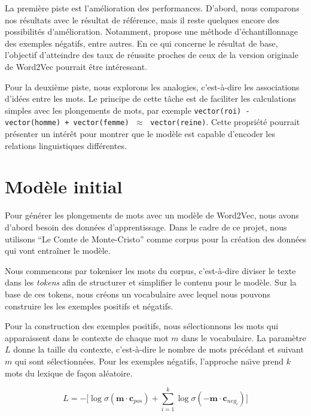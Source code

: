 \documentclass[12pt]{article}
\begin{document}
La première piste est l'amélioration des performances. D'abord, nous comparons nos résultats avec le résultat de référence, mais il reste quelques encore des possibilités d'amélioration. Notamment, \cite{DBLP:conf/nips/MikolovSCCD13} propose une méthode d’échantillonnage des exemples négatifs, entre autres. En ce qui concerne le résultat de base, l'objectif d'atteindre des taux de réussite proches de ceux de la version originale de Word2Vec pourrait être intéressant.

Pour la deuxième piste, nous explorons les analogies, c'est-à-dire les associations d'idées entre les mots. Le principe de cette tâche est de faciliter les calculations simples avec les plongements de mots, par exemple \texttt{vector(roi) - vector(homme) + vector(femme)} $\;\approx\;$ \texttt{vector(reine)}. Cette propriété pourrait présenter un intérêt pour montrer que le modèle est capable d'encoder les relations linguistiques différentes.

\section{Modèle initial} \label{modèle initial}

Pour générer les plongements de mots avec un modèle de Word2Vec, nous avons d'abord besoin des données d'apprentissage. Dans le cadre de ce projet, nous utilisons ``Le Comte de Monte-Cristo'' comme corpus pour la création des données qui vont entraîner le modèle.

Nous commencons par tokeniser les mots du corpus, c'est-à-dire diviser le texte dans les \textit{tokens} afin de structurer et simplifier le contenu pour le modèle. Sur la base de ces tokens, nous créons un vocabulaire avec lequel nous pouvons construire les les exemples positifs et négatifs.

Pour la construction des exemples positifs, nous sélectionnons les mots qui apparaissent dans le contexte de chaque mot $m$ dans le vocabulaire. La paramètre $L$ donne la taille du contexte, c'est-à-dire le nombre de mots précédant et suivant $m$ qui sont sélectionnées. Pour les exemples négatifs, l'approche na\"\i ve prend $k$ mots du lexique de façon aléatoire. 

\begin{equation}\label{eq:loss}
    L = -\lbrack \log \sigma(\mathbf{m} \cdot \mathbf{c}_{pos}) + \sum_{i=1}^k \log \sigma(-\mathbf{m} \cdot \mathbf{c}_{neg_i}) \rbrack
\end{equation}
\end{document}
